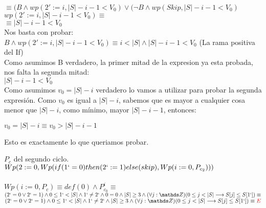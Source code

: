 \documentclass[10pt,a4paper]{article}
\begin{document}
\begin{enumerate}
    $\equiv (B \land wp(2' := i, |S| - i - 1 < V_0) \lor (\neg{B} \land wp(Skip, |S| - i - 1< V_0)$ \\

    $wp(2' := i, |S| - i - 1 < V_0) \equiv$ \\
    
    $\equiv |S| - i - 1 < V_0$ \\

    \text Nos basta con probar: \\
    $B \land wp(2' := i, |S| - i - 1 < V_0) \equiv i < |S| \land |S| - i - 1 < V_0$ (La rama positiva del If) \\

    \text Como asumimos B verdadero, la primer mitad de la expresion ya esta probada, nos falta la segunda mitad: \\ $|S| - i - 1 < V_0$ \\

    \text Como asumimos $v_0 = |S| - i$ verdadero lo vamos a utilizar para probar la segunda expresi\'on. Como $v_0$ es igual a $|S| - i$, sabemos que es mayor a cualquier cosa menor que $|S| - i$, como m\'inimo, mayor $|S| - i - 1$, entonces:
    \begin{center}
        $v_0 = |S| - i \equiv v_0 > |S| - i - 1$
    \end{center}
    \text Esto es exactamente lo que queriamos probar.
    

    
   
    
\end{enumerate}
{$P_c$ del segundo ciclo.}\\

$Wp(2:=0, Wp(if(1`=0) then (2`:=1) else (skip), Wp(i:=0,P_{c_2}))) $\\

\\

$Wp(i:=0,P_c) \equiv def(0) \land P_{c_0}^i \equiv $\\

$(2`=0 \lor 2`=1) \land 0\leq 1` <|S| \land 1`\neq 2`\land 0=0 \land |S|\geq 3 \land (\forall j: \ent)(0\leq j < |S| \longrightarrow S[j]\leq S[1`]) \equiv$ \\

$(2`=0 \lor 2`=1) \land 0\leq 1` <|S| \land 1`\neq 2` \land |S|\geq 3 \land (\forall j: \ent)(0\leq j < |S| \longrightarrow S[j]\leq S[1`]) \equiv \textcolor{red}{E}$ 
\end{document}
